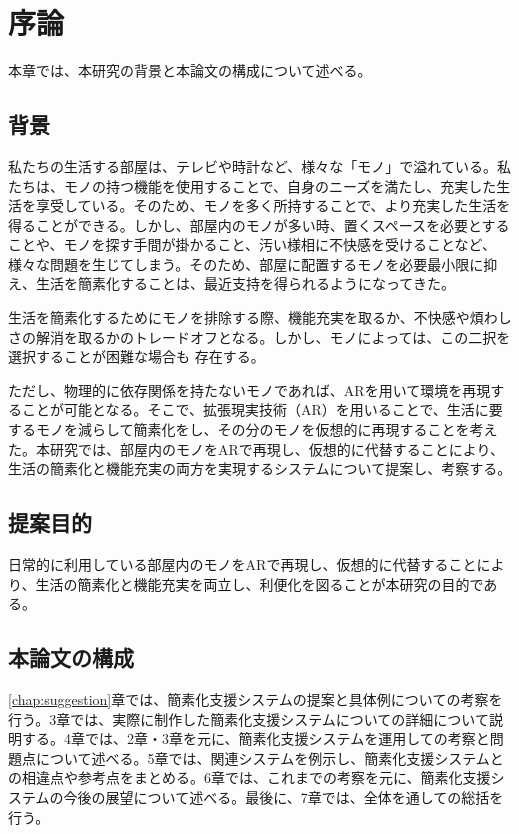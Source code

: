 \chapter{序論}
\label{chap:introduction}

本章では、本研究の背景と本論文の構成について述べる。

\newpage

\section{背景}

私たちの生活する部屋は、テレビや時計など、様々な「モノ」で溢れている。私たちは、モノの持つ機能を使用することで、自身のニーズを満たし、充実した生活を享受している。そのため、モノを多く所持することで、より充実した生活を得ることができる。しかし、部屋内のモノが多い時、置くスペースを必要とすることや、モノを探す手間が掛かること、汚い様相に不快感を受けることなど、様々な問題を生じてしまう。そのため、部屋に配置するモノを必要最小限に抑え、生活を簡素化することは、最近支持を得られるようになってきた。

生活を簡素化するためにモノを排除する際、機能充実を取るか、不快感や煩わしさの解消を取るかのトレードオフとなる。しかし、モノによっては、この二択を選択することが困難な場合も 存在する。

ただし、物理的に依存関係を持たないモノであれば、ARを用いて環境を再現することが可能となる。そこで、拡張現実技術（AR）を用いることで、生活に要するモノを減らして簡素化をし、その分のモノを仮想的に再現することを考えた。本研究では、部屋内のモノをARで再現し、仮想的に代替することにより、生活の簡素化と機能充実の両方を実現するシステムについて提案し、考察する。

\section{提案目的}

日常的に利用している部屋内のモノをARで再現し、仮想的に代替することにより、生活の簡素化と機能充実を両立し、利便化を図ることが本研究の目的である。

\section{本論文の構成}

\ref{chap:suggestion}章では、簡素化支援システムの提案と具体例についての考察を行う。3章では、実際に制作した簡素化支援システムについての詳細について説明する。4章では、2章・3章を元に、簡素化支援システムを運用しての考察と問題点について述べる。5章では、関連システムを例示し、簡素化支援システムとの相違点や参考点をまとめる。6章では、これまでの考察を元に、簡素化支援システムの今後の展望について述べる。最後に、7章では、全体を通しての総括を行う。
